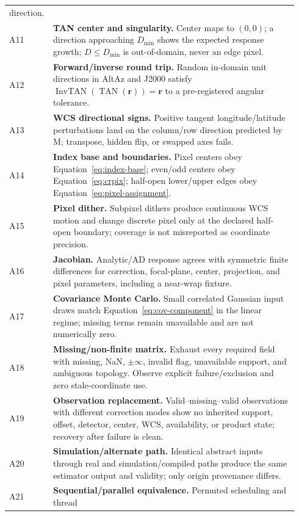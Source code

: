 \documentclass[11pt]{article}
\renewcommand{\mathsf}[1]{\mathrm{#1}}
\begin{document}
\begin{longtable}{>{\raggedright\arraybackslash}p{0.10\linewidth}
                  >{\raggedright\arraybackslash}p{0.84\linewidth}}
direction. \\
A11 & \textbf{TAN center and singularity.} Center maps to $(0,0)$; a direction
approaching $D_{\min}$ shows the expected response growth; $D\le D_{\min}$ is
out-of-domain, never an edge pixel. \\
A12 & \textbf{Forward/inverse round trip.} Random in-domain unit directions in
AltAz and J2000 satisfy
$\operatorname{InvTAN}(\operatorname{TAN}(\boldsymbol r))=\boldsymbol r$ to a
pre-registered angular tolerance. \\
A13 & \textbf{WCS directional signs.} Positive tangent longitude/latitude
perturbations land on the column/row direction predicted by $\mathsf M$;
transpose, hidden flip, or swapped axes fails. \\
A14 & \textbf{Index base and boundaries.} Pixel centers obey
Equation~\eqref{eq:index-base}; even/odd centers obey Equation~\eqref{eq:crpix};
half-open lower/upper edges obey Equation~\eqref{eq:pixel-assignment}. \\
A15 & \textbf{Pixel dither.} Subpixel dithers produce continuous WCS motion and
change discrete pixel only at the declared half-open boundary; coverage is not
misreported as coordinate precision. \\
A16 & \textbf{Jacobian.} Analytic/AD response agrees with symmetric finite
differences for correction, focal-plane, center, projection, and pixel
parameters, including a near-wrap fixture. \\
A17 & \textbf{Covariance Monte Carlo.} Small correlated Gaussian input draws
match Equation~\eqref{eq:cov-component} in the linear regime; missing terms
remain unavailable and are not numerically zero. \\
A18 & \textbf{Missing/non-finite matrix.} Exhaust every required field with
missing, NaN, $\pm\infty$, invalid flag, unavailable support, and ambiguous
topology.  Observe explicit failure/exclusion and zero stale-coordinate use.
\\
A19 & \textbf{Observation replacement.} Valid--missing--valid observations
with different correction modes show no inherited support, offset, detector,
center, WCS, availability, or product state; recovery after failure is clean.
\\
A20 & \textbf{Simulation/alternate path.} Identical abstract inputs through
real and simulation/compiled paths produce the same estimator output and
validity; only origin provenance differs. \\
A21 & \textbf{Sequential/parallel equivalence.} Permuted scheduling and thread

\end{longtable}
\end{document}
